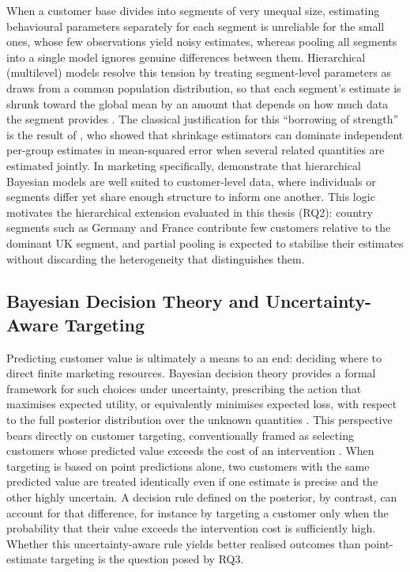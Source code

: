 \documentclass[12pt, a4paper, oneside]{report}
\begin{document}
When a customer base divides into segments of very unequal size, estimating behavioural parameters separately for each segment is unreliable for the small ones, whose few observations yield noisy estimates, whereas pooling all segments into a single model ignores genuine differences between them. Hierarchical (multilevel) models resolve this tension by treating segment-level parameters as draws from a common population distribution, so that each segment's estimate is shrunk toward the global mean by an amount that depends on how much data the segment provides \parencite{gelmanhill2006}. The classical justification for this ``borrowing of strength'' is the result of \textcite{efron1975}, who showed that shrinkage estimators can dominate independent per-group estimates in mean-squared error when several related quantities are estimated jointly. In marketing specifically, \textcite{rossi2005} demonstrate that hierarchical Bayesian models are well suited to customer-level data, where individuals or segments differ yet share enough structure to inform one another. This logic motivates the hierarchical extension evaluated in this thesis (RQ2): country segments such as Germany and France contribute few customers relative to the dominant UK segment, and partial pooling is expected to stabilise their estimates without discarding the heterogeneity that distinguishes them.

\subsection{Bayesian Decision Theory and Uncertainty-Aware Targeting}
\label{sec:decision-review}

Predicting customer value is ultimately a means to an end: deciding where to direct finite marketing resources. Bayesian decision theory provides a formal framework for such choices under uncertainty, prescribing the action that maximises expected utility, or equivalently minimises expected loss, with respect to the full posterior distribution over the unknown quantities \parencite{berger1985}. This perspective bears directly on customer targeting, conventionally framed as selecting customers whose predicted value exceeds the cost of an intervention \parencite{venkatesan2004, gupta2006}. When targeting is based on point predictions alone, two customers with the same predicted value are treated identically even if one estimate is precise and the other highly uncertain. A decision rule defined on the posterior, by contrast, can account for that difference, for instance by targeting a customer only when the probability that their value exceeds the intervention cost is sufficiently high. Whether this uncertainty-aware rule yields better realised outcomes than point-estimate targeting is the question posed by RQ3.
\end{document}
